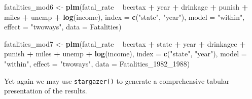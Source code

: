 \documentclass[]{book}
\newenvironment{Shaded}{\begin{snugshade}}{\end{snugshade}}
\newcommand{\KeywordTok}[1]{\textcolor[rgb]{0.13,0.29,0.53}{\textbf{#1}}}
\newcommand{\DataTypeTok}[1]{\textcolor[rgb]{0.13,0.29,0.53}{#1}}
\newcommand{\DecValTok}[1]{\textcolor[rgb]{0.00,0.00,0.81}{#1}}
\newcommand{\StringTok}[1]{\textcolor[rgb]{0.31,0.60,0.02}{#1}}
\newcommand{\OperatorTok}[1]{\textcolor[rgb]{0.81,0.36,0.00}{\textbf{#1}}}
\newcommand{\NormalTok}[1]{#1}
\theoremstyle{definition}
\theoremstyle{definition}
\theoremstyle{definition}
\theoremstyle{remark}
\begin{document}
\begin{Shaded}
\begin{Highlighting}[]
\NormalTok{fatalities_mod6 <-}\StringTok{ }\KeywordTok{plm}\NormalTok{(fatal_rate }\OperatorTok{~}\StringTok{ }\NormalTok{beertax }\OperatorTok{+}\StringTok{ }\NormalTok{year }\OperatorTok{+}\StringTok{ }\NormalTok{drinkage }
                       \OperatorTok{+}\StringTok{ }\NormalTok{punish }\OperatorTok{+}\StringTok{ }\NormalTok{miles }\OperatorTok{+}\StringTok{ }\NormalTok{unemp }\OperatorTok{+}\StringTok{ }\KeywordTok{log}\NormalTok{(income), }
                       \DataTypeTok{index =} \KeywordTok{c}\NormalTok{(}\StringTok{"state"}\NormalTok{, }\StringTok{"year"}\NormalTok{),}
                       \DataTypeTok{model =} \StringTok{"within"}\NormalTok{,}
                       \DataTypeTok{effect =} \StringTok{"twoways"}\NormalTok{,}
                       \DataTypeTok{data =}\NormalTok{ Fatalities)}

\NormalTok{fatalities_mod7 <-}\StringTok{ }\KeywordTok{plm}\NormalTok{(fatal_rate }\OperatorTok{~}\StringTok{ }\NormalTok{beertax }\OperatorTok{+}\StringTok{ }\NormalTok{state }\OperatorTok{+}\StringTok{ }\NormalTok{year }\OperatorTok{+}\StringTok{ }\NormalTok{drinkagec }
                       \OperatorTok{+}\StringTok{ }\NormalTok{punish }\OperatorTok{+}\StringTok{ }\NormalTok{miles }\OperatorTok{+}\StringTok{ }\NormalTok{unemp }\OperatorTok{+}\StringTok{ }\KeywordTok{log}\NormalTok{(income), }
                       \DataTypeTok{index =} \KeywordTok{c}\NormalTok{(}\StringTok{"state"}\NormalTok{, }\StringTok{"year"}\NormalTok{),}
                       \DataTypeTok{model =} \StringTok{"within"}\NormalTok{,}
                       \DataTypeTok{effect =} \StringTok{"twoways"}\NormalTok{,}
                       \DataTypeTok{data =}\NormalTok{ Fatalities_1982_}\DecValTok{1988}\NormalTok{)}
\end{Highlighting}
\end{Shaded}

Yet again we may use \texttt{stargazer()} to generate a comprehensive
tabular presentation of the results.
\end{document}
